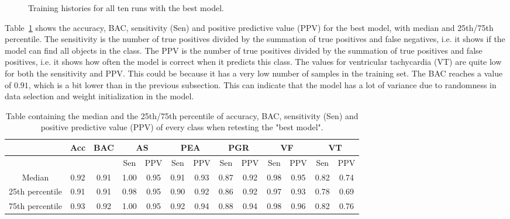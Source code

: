\begin{figure}[H]
    \centering
    
    \captionsetup{width=0.95\linewidth}
    \caption{Training histories for all ten runs with the best model.}
    \label{fig:best_history}
\end{figure}

Table~\ref{tab:rp} shows the accuracy, BAC, sensitivity (Sen) and positive predictive value (PPV) for the best model, with median and 25th/75th percentile. The sensitivity is the number of true positives divided by the summation of true positives and false negatives, i.e. it shows if the model can find all objects in the class. The PPV is the number of true positives divided by the summation of true positives and false positives, i.e. it shows how often the model is correct when it predicts this class. The values for ventricular tachycardia (VT) are quite low for both the sensitivity and PPV. This could be because it has a very low number of samples in the training set. The BAC reaches a value of $0.91$, which is a bit lower than in the previous subsection. This can indicate that the model has a lot of variance due to randomness in data selection and weight initialization in the model.

\begin{table}[H]
    \centering
    \begin{tabular}{|c|c|c|c|c|c|c|c|c|c|c|c|c|}
    \hline
         & Acc & BAC & \multicolumn{2}{c|}{AS} & \multicolumn{2}{c|}{PEA} & \multicolumn{2}{c|}{PGR} & \multicolumn{2}{c|}{VF} & \multicolumn{2}{c|}{VT}  \\ \hline
         & & & Sen & PPV & Sen & PPV & Sen & PPV & Sen & PPV & Sen & PPV \\ \hline
         Median & 0.92 & 0.91 & 1.00 & 0.95 & 0.91 & 0.93 & 0.87 & 0.92 & 0.98 & 0.95 & 0.82 & 0.74 \\ \hline
         25th percentile & 0.91 & 0.91 & 0.98 & 0.95 & 0.90 & 0.92 & 0.86 & 0.92 & 0.97 & 0.93 & 0.78 & 0.69 \\ \hline
         75th percentile & 0.93 & 0.92 & 1.00 & 0.95 & 0.92 & 0.94 & 0.88 & 0.94 & 0.98 & 0.96 & 0.82 & 0.76 \\ \hline
    \end{tabular}
    \caption{Table containing the median and the 25th/75th percentile of accuracy, BAC, sensitivity (Sen) and positive predictive value (PPV) of every class when retesting the "best model".}
    \label{tab:rp}
\end{table}


